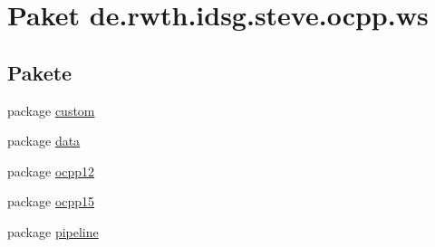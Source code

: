 \hypertarget{namespacede_1_1rwth_1_1idsg_1_1steve_1_1ocpp_1_1ws}{\section{Paket de.\-rwth.\-idsg.\-steve.\-ocpp.\-ws}
\label{namespacede_1_1rwth_1_1idsg_1_1steve_1_1ocpp_1_1ws}
}
\subsection*{Pakete}
\begin{DoxyCompactItemize}
\item 
package \hyperlink{namespacede_1_1rwth_1_1idsg_1_1steve_1_1ocpp_1_1ws_1_1custom}{custom}
\item 
package \hyperlink{namespacede_1_1rwth_1_1idsg_1_1steve_1_1ocpp_1_1ws_1_1data}{data}
\item 
package \hyperlink{namespacede_1_1rwth_1_1idsg_1_1steve_1_1ocpp_1_1ws_1_1ocpp12}{ocpp12}
\item 
package \hyperlink{namespacede_1_1rwth_1_1idsg_1_1steve_1_1ocpp_1_1ws_1_1ocpp15}{ocpp15}
\item 
package \hyperlink{namespacede_1_1rwth_1_1idsg_1_1steve_1_1ocpp_1_1ws_1_1pipeline}{pipeline}
\end{DoxyCompactItemize}
